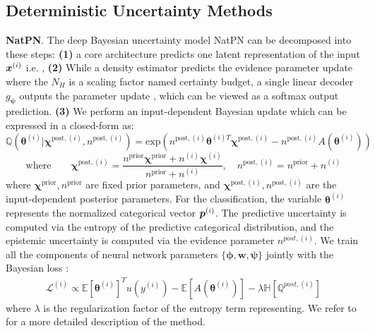\subsection{Deterministic Uncertainty Methods}
\label{appendix:dums}

\textbf{NatPN}. The deep Bayesian uncertainty model NatPN \citep{NatPN2021} can be decomposed into these steps: 
\textbf{(1)} a core architecture predicts one latent representation of the input $\bm{x}^{(i)}$ i.e. , 
\textbf{(2)} While a density estimator  predicts the evidence parameter update  where the $N_H$ is a scaling factor named certainty budget, a single linear decoder $g_{\bm{\psi}}$ outputs the parameter update , which can be viewed as a softmax output prediction.
\textbf{(3)} We perform an input-dependent Bayesian update which can be expressed in a closed-form as:
$$\mathbb{Q}(\boldsymbol{\theta}^{(i)}|\boldsymbol{\chi}^{\text{post},(i)}, n^{\text{post},(i)}) = \text{exp}(n^{\text{post},(i)}\boldsymbol{\theta}^{(i) T}\boldsymbol{\chi}^{\text{post},(i)}-n^{\text{post},(i)}A(\boldsymbol{\theta}^{(i)}))$$
$$\text{where} \qquad \boldsymbol{\chi}^{\text{post},(i)}=\frac{n^{\text{prior}}\boldsymbol{\chi}^{\text{prior}}+n^{(i)}\boldsymbol{\chi}^{(i)}}{n^{\text{prior}}+n^{(i)}}, \quad n^{\text{post},(i)}=n^\text{prior}+n^{(i)}$$
where $\boldsymbol{\chi}^\text{prior}, n^\text{prior}$ are fixed prior parameters, and  $\boldsymbol{\chi}^{\text{post}, (i)}, n^{\text{post}, (i)}$ are the input-dependent posterior parameters.
For the classification, the variable $\boldsymbol{\theta}^{(i)}$ represents the normalized categorical vector $\bm{p}^{(i)}$. The predictive uncertainty is computed via the entropy of the predictive categorical distribution, and the epistemic uncertainty is computed via the evidence parameter $n^{post,(i)}$. We train all the components of neural network parameters $\{\bm{\phi}, \bm{w}, \bm{\psi}\}$ jointly with the Bayesian loss \citep{NatPN2021}:
\begin{equation}
    \begin{split}
        \mathcal{L}^{(i)} \propto \mathbb{E}[\boldsymbol{\theta}^{(i)}]^T u(y^{(i)})-\mathbb{E}[A(\boldsymbol{\theta}^{(i)})]- \lambda\mathbb{H}[\mathbb{Q}^{post,(i)}] 
    \end{split}
\end{equation}
where $\lambda$ is the regularization factor of the entropy term representing. We refer to \citep{NatPN2021} for a more detailed description of the method.

